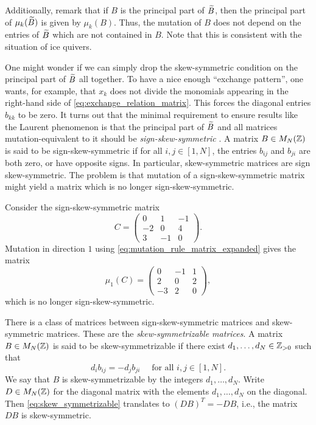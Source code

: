 Additionally, remark that if $B$ is the principal part of $\widetilde{B}$, then the principal
part of $\mu_k(\widetilde{B})$ is given by $\mu_k(B)$. Thus, the mutation of $B$ does not depend
on the entries of $\widetilde{B}$ which are not contained in $B$. Note that this is consistent
with the situation of ice quivers.

One might wonder if we can simply drop the skew-symmetric condition on the principal
part of $\widetilde{B}$ all together. To have a nice enough ``exchange pattern'', one wants, for
example, that $x_k$ does not divide the monomials appearing in the right-hand side of
\cref{eq:exchange_relation_matrix}. This forces the diagonal entries $b_{kk}$ to be
zero. It turns out that the minimal requirement to ensure results like the Laurent
phenomenon is that the principal part of $\widetilde{B}$ and all matrices mutation-equivalent to
it should be
\emph{sign-skew-symmetric}
\parencite[Proposition 4.3]{FominZelevinsky2002CAF}. A matrix $B \in M_N(\mathbb{Z})$ is said to
be sign-skew-symmetric if for all $i,j \in [1, N]$, the entries $b_{ij}$ and $b_{ji}$
are both zero, or have opposite signs. In particular, skew-symmetric matrices are sign
skew-symmetric. The problem is that mutation of a sign-skew-symmetric matrix might
yield a matrix which is no longer sign-skew-symmetric.

\begin{example}
	Consider the sign-skew-symmetric matrix
	\begin{equation*}
		C = \begin{pmatrix}
			0  & 1  & -1 \\
			-2 & 0  & 4  \\
			3  & -1 & 0
		\end{pmatrix}.
	\end{equation*}
	Mutation in direction $1$ using \cref{eq:mutation_rule_matrix_expanded} gives the
	matrix
	\begin{equation*}
		\mu_1(C) = \begin{pmatrix}
			0  & -1 & 1 \\
			2  & 0  & 2 \\
			-3 & 2  & 0
		\end{pmatrix},
	\end{equation*}
	which is no longer sign-skew-symmetric.
\end{example}

There is a class of matrices between sign-skew-symmetric matrices and skew-symmetric
matrices. These are the \emph{skew-symmetrizable
	matrices}. A matrix $B \in M_N(\mathbb{Z})$ is said to be
skew-symmetrizable if there exist $d_1, \dots, d_N \in \mathbb{Z}_{> 0}$ such that
\begin{equation}\label{eq:skew_symmetrizable}
	d_i b_{ij} = -d_j b_{ji}\quad  \text{ for all } i,j \in [1, N].
\end{equation}
%
We say that $B$ is skew-symmetrizable by the integers $d_1, \dots, d_N$. Write $D \in
	M_N(\mathbb{Z})$ for the diagonal matrix with the elements $d_1, \dots, d_N$ on the diagonal.
Then \cref{eq:skew_symmetrizable} translates to $(DB)^T = -DB$, i.e., the matrix $DB$
is skew-symmetric.

